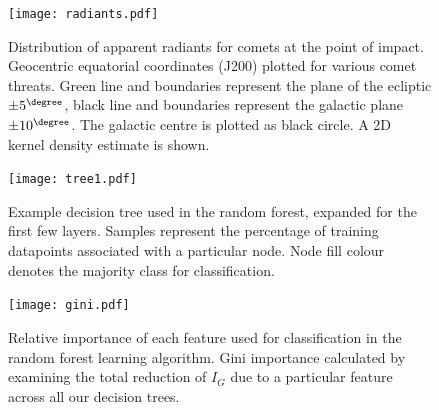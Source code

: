 \begin{figure}[h!]
    \centering
    \texttt{[image: radiants.pdf]}
    \caption[Distribution of apparent radiants]{Distribution of apparent radiants for comets at the point of impact. Geocentric equatorial coordinates (J200) plotted for various comet threats. Green line and boundaries represent the plane of the ecliptic $\pm5^\degree$, black line and boundaries represent the galactic plane $\pm10^\degree$. The galactic centre is plotted as black circle. A 2D kernel density estimate is shown.}
    \label{fig:radiants}
\end{figure}

\begin{figure}[h!]
    \centering
    \texttt{[image: tree1.pdf]}
    \vspace{.5ex}
    \caption[Example decision tree]{Example decision tree used in the random forest, expanded for the first few layers. Samples represent the percentage of training datapoints associated with a particular node. Node fill colour denotes the majority class for classification.}
    \label{fig:tree}
\end{figure}

\begin{figure}[h!]
    \centering
    \texttt{[image: gini.pdf]}
    \caption[Relative importance of orbital characteristics in learning algorithm]{Relative importance of each feature used for classification in the random forest learning algorithm. Gini importance calculated by examining the total reduction of $I_G$ due to a particular feature across all our decision trees.}
    \label{fig:gini}
\end{figure}


